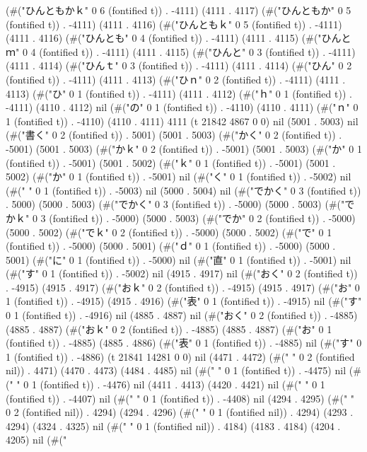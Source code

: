 (#("ひんともかｋ" 0 6 (fontified t)) . -4111) (4111 . 4117) (#("ひんともか" 0 5 (fontified t)) . -4111) (4111 . 4116) (#("ひんともｋ" 0 5 (fontified t)) . -4111) (4111 . 4116) (#("ひんとも" 0 4 (fontified t)) . -4111) (4111 . 4115) (#("ひんとｍ" 0 4 (fontified t)) . -4111) (4111 . 4115) (#("ひんと" 0 3 (fontified t)) . -4111) (4111 . 4114) (#("ひんｔ" 0 3 (fontified t)) . -4111) (4111 . 4114) (#("ひん" 0 2 (fontified t)) . -4111) (4111 . 4113) (#("ひｎ" 0 2 (fontified t)) . -4111) (4111 . 4113) (#("ひ" 0 1 (fontified t)) . -4111) (4111 . 4112) (#("ｈ" 0 1 (fontified t)) . -4111) (4110 . 4112) nil (#("の" 0 1 (fontified t)) . -4110) (4110 . 4111) (#("ｎ" 0 1 (fontified t)) . -4110) (4110 . 4111) 4111 (t 21842 4867 0 0) nil (5001 . 5003) nil (#("書く" 0 2 (fontified t)) . 5001) (5001 . 5003) (#("かく" 0 2 (fontified t)) . -5001) (5001 . 5003) (#("かｋ" 0 2 (fontified t)) . -5001) (5001 . 5003) (#("か" 0 1 (fontified t)) . -5001) (5001 . 5002) (#("ｋ" 0 1 (fontified t)) . -5001) (5001 . 5002) (#("か" 0 1 (fontified t)) . -5001) nil (#("く" 0 1 (fontified t)) . -5002) nil (#(" " 0 1 (fontified t)) . -5003) nil (5000 . 5004) nil (#("でかく" 0 3 (fontified t)) . 5000) (5000 . 5003) (#("でかく" 0 3 (fontified t)) . -5000) (5000 . 5003) (#("でかｋ" 0 3 (fontified t)) . -5000) (5000 . 5003) (#("でか" 0 2 (fontified t)) . -5000) (5000 . 5002) (#("でｋ" 0 2 (fontified t)) . -5000) (5000 . 5002) (#("で" 0 1 (fontified t)) . -5000) (5000 . 5001) (#("ｄ" 0 1 (fontified t)) . -5000) (5000 . 5001) (#("に" 0 1 (fontified t)) . -5000) nil (#("直" 0 1 (fontified t)) . -5001) nil (#("す" 0 1 (fontified t)) . -5002) nil (4915 . 4917) nil (#("おく" 0 2 (fontified t)) . -4915) (4915 . 4917) (#("おｋ" 0 2 (fontified t)) . -4915) (4915 . 4917) (#("お" 0 1 (fontified t)) . -4915) (4915 . 4916) (#("表" 0 1 (fontified t)) . -4915) nil (#("す" 0 1 (fontified t)) . -4916) nil (4885 . 4887) nil (#("おく" 0 2 (fontified t)) . -4885) (4885 . 4887) (#("おｋ" 0 2 (fontified t)) . -4885) (4885 . 4887) (#("お" 0 1 (fontified t)) . -4885) (4885 . 4886) (#("表" 0 1 (fontified t)) . -4885) nil (#("す" 0 1 (fontified t)) . -4886) (t 21841 14281 0 0) nil (4471 . 4472) (#("  " 0 2 (fontified nil)) . 4471) (4470 . 4473) (4484 . 4485) nil (#("
" 0 1 (fontified t)) . -4475) nil (#("	" 0 1 (fontified t)) . -4476) nil (4411 . 4413) (4420 . 4421) nil (#("
" 0 1 (fontified t)) . -4407) nil (#("	" 0 1 (fontified t)) . -4408) nil (4294 . 4295) (#("  " 0 2 (fontified nil)) . 4294) (4294 . 4296) (#(" " 0 1 (fontified nil)) . 4294) (4293 . 4294) (4324 . 4325) nil (#(" " 0 1 (fontified nil)) . 4184) (4183 . 4184) (4204 . 4205) nil (#("

